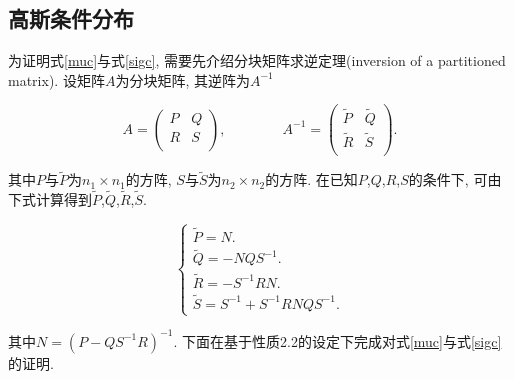     \subsection{高斯条件分布} \label{A.2}

        为证明式\ref{muc}与式\ref{sigc}, 需要先介绍分块矩阵求逆定理(inversion of a
        partitioned matrix)\cite{rasmussen2006gaussian}. 设矩阵$A$为分块矩阵, 其逆阵为$A^{-1}$

        \begin{equation}
            A=  \begin{pmatrix}
                    P & Q \\
                    R & S \\
                \end{pmatrix}, \qquad\qquad
            A^{-1}= \begin{pmatrix}
                        \tilde{P} & \tilde{Q} \\
                        \tilde{R} & \tilde{S} \\
                    \end{pmatrix}.
        \end{equation}

        其中$P$与$\tilde{P}$为$n_{1}\times n_{1}$的方阵, $S$与$\tilde{S}$为$n_{2}\times n_{2}$的方阵. 在已知$P$,$Q$,$R$,$S$的条件下, 可由下式计算得到$\tilde{P}$,$\tilde{Q}$,$\tilde{R}$,$\tilde{S}$.

        \begin{equation}
            \begin{cases}
                \tilde{P}=N. \\
                \tilde{Q}=-NQS^{-1}. \\ 
                \tilde{R}=-S^{-1}RN. \\
                \tilde{S}=S^{-1}+S^{-1}RNQS^{-1}. \label{A2.6}
            \end{cases}
        \end{equation}

        其中$N=(P-QS^{-1}R)^{-1}$. 下面在基于性质2.2的设定下完成对式\ref{muc}与式\ref{sigc}的证明.

